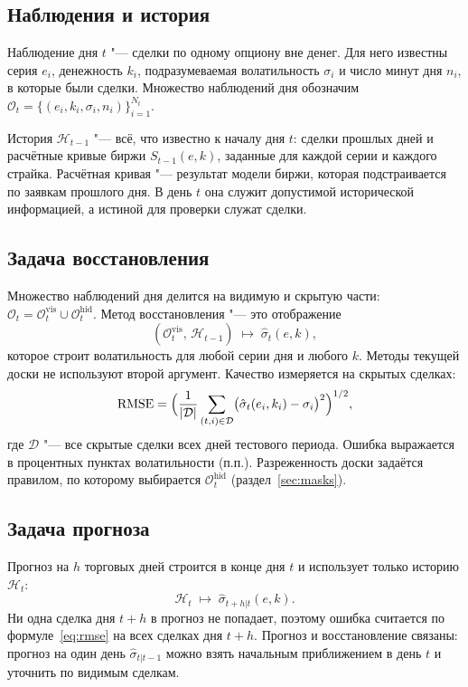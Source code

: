 \documentclass{article}
\begin{document}
\subsection{Наблюдения и история}

Наблюдение дня $t$ "--- сделки по одному опциону вне денег. Для него известны серия $e_i$, денежность $k_i$, подразумеваемая волатильность $\sigma_i$ и число минут дня $n_i$, в которые были сделки. Множество наблюдений дня обозначим $\mathcal{O}_t=\{(e_i,k_i,\sigma_i,n_i)\}_{i=1}^{N_t}$.

История $\mathcal{H}_{t-1}$ "--- всё, что известно к началу дня $t$: сделки прошлых дней и расчётные кривые биржи $S_{t-1}(e,k)$, заданные для каждой серии и каждого страйка. Расчётная кривая "--- результат модели биржи, которая подстраивается по заявкам прошлого дня. В день $t$ она служит допустимой исторической информацией, а истиной для проверки служат сделки.

\subsection{Задача восстановления}

Множество наблюдений дня делится на видимую и скрытую части: $\mathcal{O}_t=\mathcal{O}_t^{\mathrm{vis}}\cup\mathcal{O}_t^{\mathrm{hid}}$. Метод восстановления "--- это отображение
\[
(\mathcal{O}_t^{\mathrm{vis}},\,\mathcal{H}_{t-1})\;\longmapsto\;\hat\sigma_t(e,k),
\]
которое строит волатильность для любой серии дня и любого $k$. Методы текущей доски не используют второй аргумент. Качество измеряется на скрытых сделках:
\begin{equation}\label{eq:rmse}
\mathrm{RMSE}=\Bigl(\frac{1}{|\mathcal{D}|}\sum_{(t,i)\in\mathcal{D}}\bigl(\hat\sigma_t(e_i,k_i)-\sigma_i\bigr)^2\Bigr)^{1/2},
\end{equation}
где $\mathcal{D}$ "--- все скрытые сделки всех дней тестового периода. Ошибка выражается в процентных пунктах волатильности (п.п.). Разреженность доски задаётся правилом, по которому выбирается $\mathcal{O}_t^{\mathrm{hid}}$ (раздел~\ref{sec:masks}).

\subsection{Задача прогноза}

Прогноз на $h$ торговых дней строится в конце дня $t$ и использует только историю $\mathcal{H}_t$:
\[
\mathcal{H}_t\;\longmapsto\;\hat\sigma_{t+h|t}(e,k).
\]
Ни одна сделка дня $t+h$ в прогноз не попадает, поэтому ошибка считается по формуле~\eqref{eq:rmse} на всех сделках дня $t+h$. Прогноз и восстановление связаны: прогноз на один день $\hat\sigma_{t|t-1}$ можно взять начальным приближением в день $t$ и уточнить по видимым сделкам.
\end{document}
